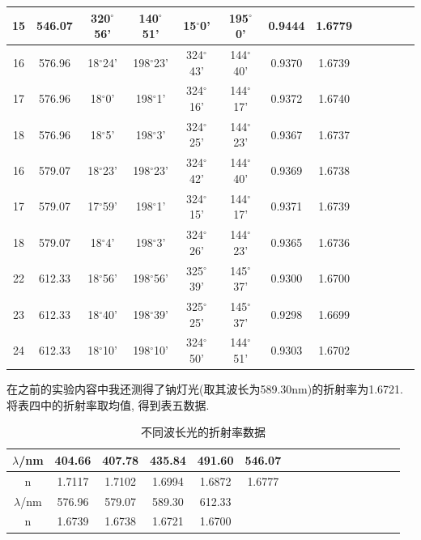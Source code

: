\documentclass[a4paper,12pt,notitlepage]{article}
\begin{document}
\begin{center}
\begin{longtable}{|c|c|c|c|c|c|c|c|c|c|c|c|c|}
	\hline
	15 & 546.07 & 320$^\circ$56' & 140$^\circ$51' & 15$^\circ$0' & 195$^\circ$0' & 0.9444 & 1.6779 \\
	\hline
	\hline
	16 & 576.96 & 18$^\circ$24' & 198$^\circ$23' & 324$^\circ$43' & 144$^\circ$40' & 0.9370 & 1.6739 \\
	\hline
	17 & 576.96 & 18$^\circ$0' & 198$^\circ$1' & 324$^\circ$16' & 144$^\circ$17' & 0.9372 & 1.6740 \\
	\hline
	18 & 576.96 & 18$^\circ$5' & 198$^\circ$3' & 324$^\circ$25' & 144$^\circ$23' & 0.9367 & 1.6737 \\
	\hline
	\hline
	16 & 579.07 & 18$^\circ$23' & 198$^\circ$23' & 324$^\circ$42' & 144$^\circ$40' & 0.9369 & 1.6738 \\
	\hline
	17 & 579.07 & 17$^\circ$59' & 198$^\circ$1' & 324$^\circ$15' & 144$^\circ$17' & 0.9371 & 1.6739 \\
	\hline
	18 & 579.07 & 18$^\circ$4' & 198$^\circ$3' & 324$^\circ$26' & 144$^\circ$23' & 0.9365 & 1.6736 \\
	\hline
	\hline
	22 & 612.33 & 18$^\circ$56' & 198$^\circ$56' & 325$^\circ$39' & 145$^\circ$37' & 0.9300 & 1.6700 \\
	\hline
	23 & 612.33 & 18$^\circ$40' & 198$^\circ$39' & 325$^\circ$25' & 145$^\circ$37' & 0.9298 & 1.6699 \\
	\hline
	24 & 612.33 & 18$^\circ$10' & 198$^\circ$10' & 324$^\circ$50' & 144$^\circ$51' & 0.9303 & 1.6702 \\
	\hline
	
	\end{longtable}
\end{center}

	在之前的实验内容中我还测得了钠灯光(取其波长为589.30nm)的折射率为1.6721. 将表四中的折射率取均值, 得到表五数据.
	
\begin{center}
	\begin{longtable}{|c|c|c|c|c|c|c|c|c|c|c|c|c|c|c|c|}
	
	\caption{不同波长光的折射率数据} \\
	\hline
	$\lambda$/nm & 404.66 & 407.78 & 435.84 & 491.60 & 546.07 \\
	\hline	
	n & 1.7117 & 1.7102 & 1.6994 & 1.6872 & 1.6777 \\
	\hline
	\hline
	$\lambda$/nm & 576.96 & 579.07 & 589.30 & 612.33 & \\
	\hline	
	n & 1.6739 & 1.6738 & 1.6721 & 1.6700 & \\
	\hline
	
	\end{longtable}
\end{center}
	
\end{document}
